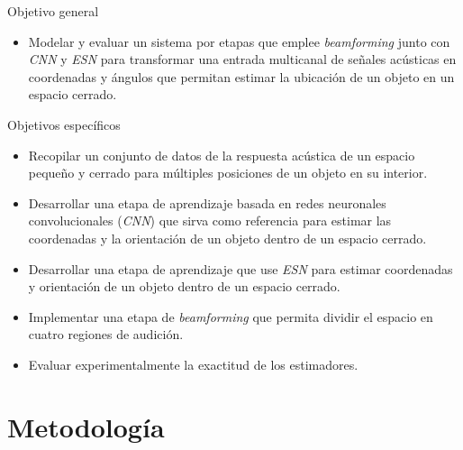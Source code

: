 \documentclass[aspectratio=169]{beamer}
\begin{document}
\begin{frame}{Objetivo general}

\begin{itemize}
\item[$\checkmark$] Modelar y evaluar un sistema por etapas que emplee \textit{beamforming} junto con \textit{CNN} y \textit{ESN} para transformar una entrada multicanal de señales acústicas en coordenadas y ángulos que permitan estimar la ubicación de un objeto en un espacio cerrado.
\end{itemize}

\end{frame}


\begin{frame}{Objetivos específicos}

\begin{itemize}%
\item[$\checkmark$] Recopilar un conjunto de datos de la respuesta acústica de un espacio pequeño y cerrado para múltiples posiciones de un objeto en su interior.
\item[$\checkmark$] Desarrollar una etapa de aprendizaje basada en redes neuronales convolucionales (\textit{CNN}) que sirva como referencia para estimar las coordenadas y la orientación de un objeto dentro de un espacio cerrado.
\item[$\checkmark$] Desarrollar una etapa de aprendizaje que use \textit{ESN} para estimar coordenadas y orientación de un objeto dentro de un espacio cerrado.
\item[$\checkmark$] Implementar una etapa de \textit{beamforming} que permita dividir el espacio en cuatro regiones de audición.
\item[$\checkmark$] Evaluar experimentalmente la exactitud de los estimadores. 


\end{itemize}
\end{frame}



\section{Metodología}

\begin{frame}{}
\end{frame}
\end{document}
